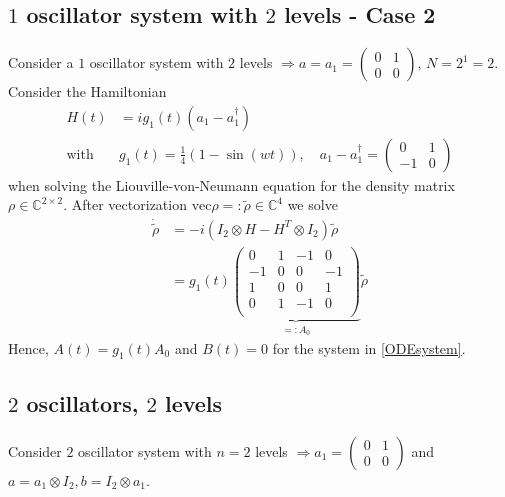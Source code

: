 \documentclass[12pt]{article}
\begin{document}
\subsection{$1$ oscillator system with $2$ levels - Case 2}
Consider a $1$ oscillator system with $2$ levels $\Rightarrow a = a_1 = \begin{pmatrix} 0 & 1 \\ 0 & 0 \end{pmatrix}$, $N=2^1 = 2$.
Consider the Hamiltonian 
\begin{align*}
H(t) &= ig_1(t) (a_1 - a_1^{\dagger})\\ 
\text{with} \quad &g_1(t) = \frac 14(1-\sin(wt)), \quad a_1 - a_1^{\dagger} = \begin{pmatrix} 0 &1 \\ -1 & 0 \end{pmatrix}
\end{align*}
when solving the Liouville-von-Neumann equation for the density matrix $\rho \in \mathds{C}^{2\times 2}$. After vectorization $\text{vec} \rho =: \tilde \rho \in \mathds{C}^4$ we solve
\begin{align*}
   \dot{\tilde\rho} & = -i(I_2 \otimes H - H^T \otimes I_2) \tilde\rho \\
                     &= g_1(t) 
                  \underbrace{\begin{pmatrix}
                  0 &  1 & -1& 0 \\
                 -1 &  0 & 0 & -1\\
                  1 &  0 & 0 &  1\\
                  0 &  1 & -1& 0 \\
                  \end{pmatrix}}_{=: A_0} \tilde \rho
\end{align*}
 Hence, $A(t) = g_1(t)A_0$ and $B(t) =  0$ for the system in \eqref{ODEsystem}.




\subsection{$2$ oscillators, $2$ levels}
Consider $2$ oscillator system with $n=2$ levels $\Rightarrow a_1 = \begin{pmatrix} 0 & 1 \\ 0 & 0 \end{pmatrix}$ and $a = a_1\otimes I_2, b = I_2 \otimes a_1$.
\end{document}
